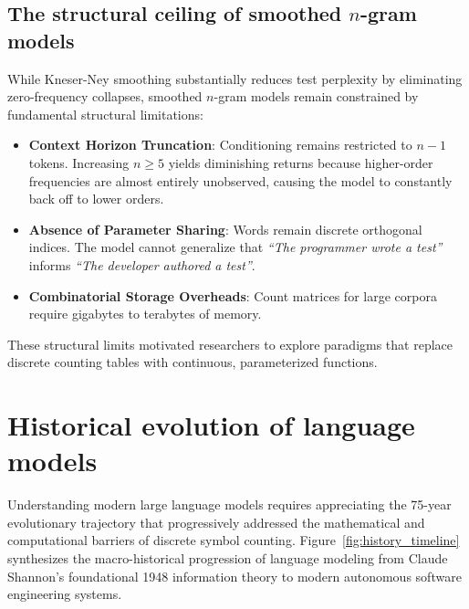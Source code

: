 \documentclass[../../main.tex]{subfiles}
\begin{document}
\subsection{The structural ceiling of smoothed $n$-gram models}
While Kneser-Ney smoothing substantially reduces test perplexity by eliminating zero-frequency collapses, smoothed $n$-gram models remain constrained by fundamental structural limitations:
\begin{itemize}
    \item \textbf{Context Horizon Truncation}: Conditioning remains restricted to $n-1$ tokens. Increasing $n \ge 5$ yields diminishing returns because higher-order frequencies are almost entirely unobserved, causing the model to constantly back off to lower orders.
    \item \textbf{Absence of Parameter Sharing}: Words remain discrete orthogonal indices. The model cannot generalize that \textit{``The programmer wrote a test''} informs \textit{``The developer authored a test''}.
    \item \textbf{Combinatorial Storage Overheads}: Count matrices for large corpora require gigabytes to terabytes of memory.
\end{itemize}
These structural limits motivated researchers to explore paradigms that replace discrete counting tables with continuous, parameterized functions.

\clearpage
\section{Historical evolution of language models}
\label{sec:history_lms}

Understanding modern large language models requires appreciating the 75-year evolutionary trajectory that progressively addressed the mathematical and computational barriers of discrete symbol counting. Figure~\ref{fig:history_timeline} synthesizes the macro-historical progression of language modeling from Claude Shannon's foundational 1948 information theory to modern autonomous software engineering systems.
\end{document}

